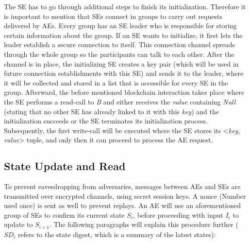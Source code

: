 The SE has to go through additional steps to finish its initialization. Therefore it is important to mention that SEs connect in groups to carry out requests delivered by AEs. Every group has an SE leader who is responsible for storing certain information about the group. If an SE wants to initialize, it first lets the leader establish a secure connection to itself. This connection channel spreads through the whole group so the participants can talk to each other. After the channel is in place, the initializing SE creates a key pair (which will be used in future connection establishments with this SE) and sends it to the leader, where it will be collected and stored in a list that is accessible for every SE in the group. Afterward, the before mentioned blockchain interaction takes place where the SE performs a read-call to \textit{B} and either receives the \textit{value} containing \textit{Null} (stating that no other SE has already linked to it with this \textit{key}) and the initialization succeeds or the SE terminates its initialization process. Subsequently, the first write-call will be executed where the SE stores its <\textit{key}, \textit{value}> tuple, and only then it can proceed to process the AE request.

\subsection{State Update and Read}

To prevent eavesdropping from adversaries, messages between AEs and SEs are transmitted over encrypted channels, using secret session keys. A nonce (Number used once) is sent as well to prevent replays. An AE will use an aforementioned group of SEs to confirm its current state \(S_i\), before proceeding with input \(I_i\) to update to \(S_{i+1}\). The following paragraphs will explain this procedure further (\(SD_{i}\) refers to the state digest, which is a summary of the latest states):

